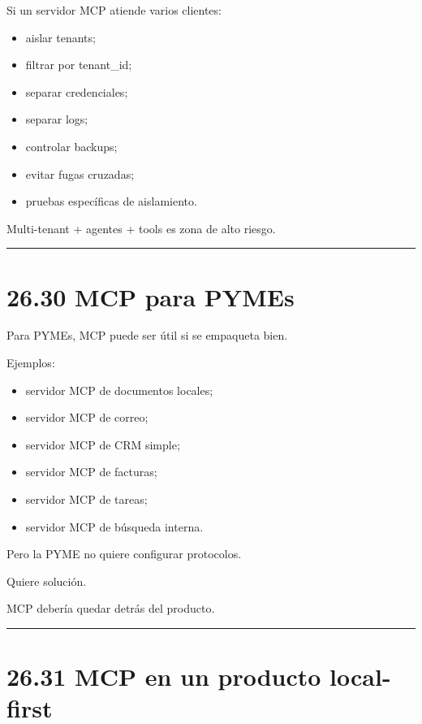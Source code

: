 Si un servidor MCP atiende varios clientes:

\begin{itemize}
\tightlist
\item
  aislar tenants;
\item
  filtrar por tenant\_id;
\item
  separar credenciales;
\item
  separar logs;
\item
  controlar backups;
\item
  evitar fugas cruzadas;
\item
  pruebas específicas de aislamiento.
\end{itemize}

Multi-tenant + agentes + tools es zona de alto riesgo.

\begin{center}\rule{0.5\linewidth}{0.5pt}\end{center}

\section{26.30 MCP para PYMEs}\label{mcp-para-pymes}

Para PYMEs, MCP puede ser útil si se empaqueta bien.

Ejemplos:

\begin{itemize}
\tightlist
\item
  servidor MCP de documentos locales;
\item
  servidor MCP de correo;
\item
  servidor MCP de CRM simple;
\item
  servidor MCP de facturas;
\item
  servidor MCP de tareas;
\item
  servidor MCP de búsqueda interna.
\end{itemize}

Pero la PYME no quiere configurar protocolos.

Quiere solución.

MCP debería quedar detrás del producto.

\begin{center}\rule{0.5\linewidth}{0.5pt}\end{center}

\section{26.31 MCP en un producto
local-first}\label{mcp-en-un-producto-local-first}

